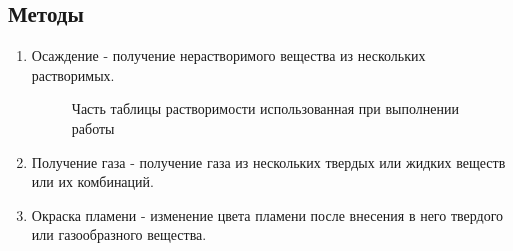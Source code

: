 \documentclass[a4paper,14pt,notitlepage,twoside]{article}
\begin{document}
        \subsection{Методы}
            \begin{enumerate}
                \item
                    Осаждение - получение нерастворимого вещества из нескольких 
                    растворимых.

                    \begin{figure}[h]
                        \caption{Часть таблицы растворимости использованная при выполнении работы}
                    \end{figure}

                
                \item
                    Получение газа - получение газа из нескольких твердых или жидких
                    веществ или их комбинаций.

                \item 
                    Окраска пламени - изменение цвета пламени после внесения в него
                    твердого или газообразного вещества.\\


\end{enumerate}
\end{document}
